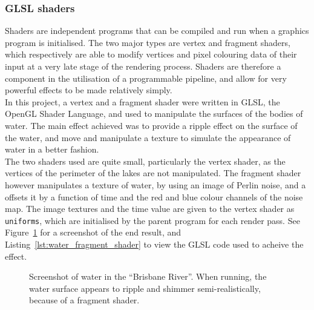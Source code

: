         \subsubsection{GLSL shaders} %
        \label{ssub:glsl_shaders}
            Shaders are independent programs that can be compiled and run when a graphics program is initialised.
            The two major types are vertex and fragment shaders, which respectively are able to modify vertices and pixel colouring data of their input at a very late stage of the rendering process.
            Shaders are therefore a component in the utilisation of a programmable pipeline, and allow for very powerful effects to be made relatively simply.\\

            In this project, a vertex and a fragment shader were written in GLSL, the OpenGL Shader Language, and used to manipulate the surfaces of the bodies of water.
            The main effect achieved was to provide a ripple effect on the surface of the water, and move and manipulate a texture to simulate the appearance of water in a better fashion.\\

            The two shaders used are quite small, particularly the vertex shader, as the vertices of the perimeter of the lakes are not manipulated.
            The fragment shader however manipulates a texture of water, by using an image of Perlin noise, and a offsets it by a function of time and the red and blue colour channels of the noise map.
            The image textures and the time value are given to the vertex shader as \texttt{uniforms}, which are initialised by the parent program for each render pass. See Figure~\ref{fig:water} for a screenshot of the end result, and Listing~\ref{lst:water_fragment_shader} to view the GLSL code used to acheive the effect.

            \begin{figure}[H]
                \centering
                \caption{
                    Screenshot of water in the ``Brisbane River''.
                    When running, the water surface appears to ripple and shimmer semi-realistically, because of a fragment shader.
                }
                \label{fig:water}
            \end{figure}

